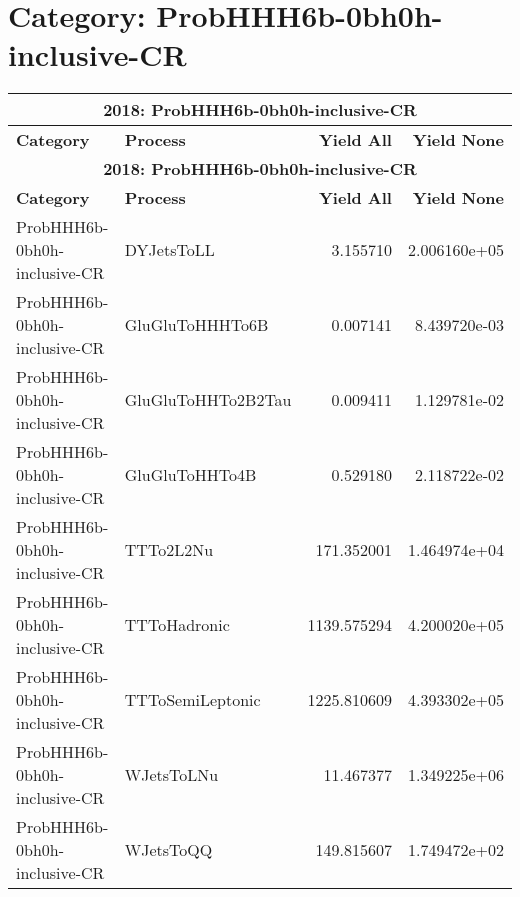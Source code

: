 \documentclass{article}
\begin{document}
\section*{Category: ProbHHH6b-0bh0h-inclusive-CR}
\begin{longtable}[c]{|l|l|r|r|}
\hline
\multicolumn{4}{|c|}{\textbf{2018: ProbHHH6b-0bh0h-inclusive-CR}} \\
\hline
\textbf{Category} & \textbf{Process} & \textbf{Yield All} & \textbf{Yield None} \\
\hline
\endfirsthead
\hline
\multicolumn{4}{|c|}{\textbf{2018: ProbHHH6b-0bh0h-inclusive-CR}} \\
\hline
\textbf{Category} & \textbf{Process} & \textbf{Yield All} & \textbf{Yield None} \\
\hline
\endhead
ProbHHH6b-0bh0h-inclusive-CR & DYJetsToLL & 3.155710 & 2.006160e+05 \\
\hline
ProbHHH6b-0bh0h-inclusive-CR & GluGluToHHHTo6B & 0.007141 & 8.439720e-03 \\
\hline
ProbHHH6b-0bh0h-inclusive-CR & GluGluToHHTo2B2Tau & 0.009411 & 1.129781e-02 \\
\hline
ProbHHH6b-0bh0h-inclusive-CR & GluGluToHHTo4B & 0.529180 & 2.118722e-02 \\
\hline
ProbHHH6b-0bh0h-inclusive-CR & TTTo2L2Nu & 171.352001 & 1.464974e+04 \\
\hline
ProbHHH6b-0bh0h-inclusive-CR & TTToHadronic & 1139.575294 & 4.200020e+05 \\
\hline
ProbHHH6b-0bh0h-inclusive-CR & TTToSemiLeptonic & 1225.810609 & 4.393302e+05 \\
\hline
ProbHHH6b-0bh0h-inclusive-CR & WJetsToLNu & 11.467377 & 1.349225e+06 \\
\hline
ProbHHH6b-0bh0h-inclusive-CR & WJetsToQQ & 149.815607 & 1.749472e+02 \\
\hline
\end{longtable}
\end{document}
